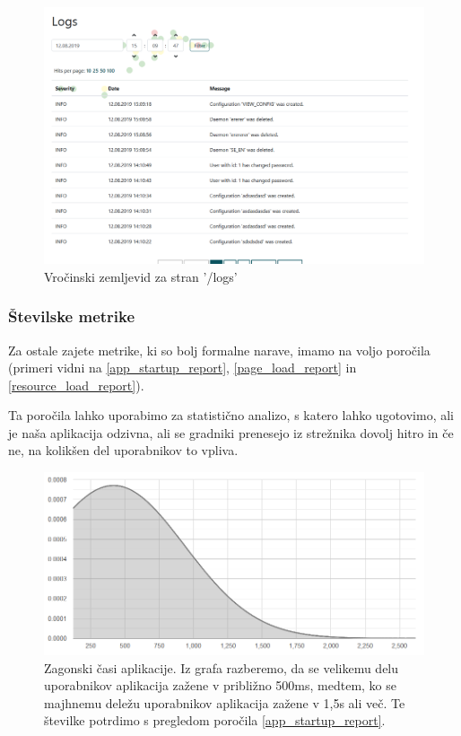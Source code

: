 \documentclass[a4paper, 12pt]{book}
\begin{document}
\begin{figure}[h]
	\begin{center}
		\includegraphics[width=1\textwidth]{heatmap_2.png}
	\end{center}
	\caption{Vročinski zemljevid  za stran '/logs'}
	\label{img:heatmap2}
\end{figure}

\subsubsection{Številske metrike}

Za ostale zajete metrike, ki so bolj formalne narave, imamo na voljo poročila (primeri vidni na \ref{app_startup_report}, \ref{page_load_report} in \ref{resource_load_report}).

Ta poročila lahko uporabimo za statistično analizo, s katero lahko ugotovimo, ali je naša aplikacija odzivna, ali se gradniki prenesejo iz strežnika dovolj hitro in če ne, na kolikšen del uporabnikov to vpliva.

\begin{figure}[h]
	\begin{center}
		\includegraphics[width=1\textwidth]{app_startup_graph.png}
	\end{center}
	\caption{Zagonski časi aplikacije. Iz grafa razberemo, da se velikemu delu uporabnikov aplikacija zažene v približno 500ms, medtem, ko se majhnemu deležu uporabnikov aplikacija zažene v 1,5s ali več. Te številke potrdimo s pregledom poročila \ref{app_startup_report}.}
	\label{img:graph_app_startup}
\end{figure}
\end{document}
